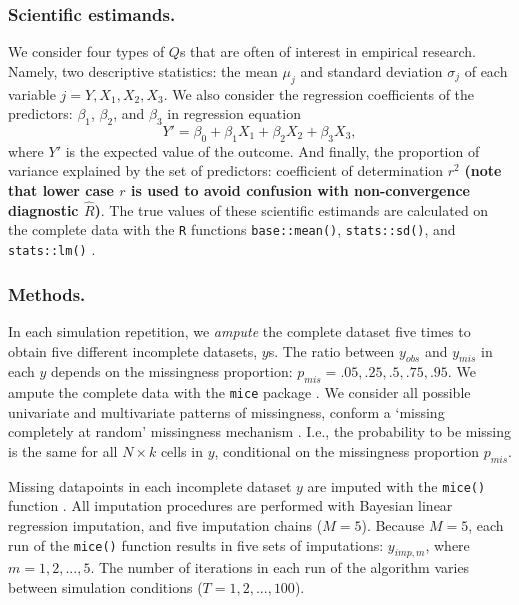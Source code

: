 \documentclass[Royal,times,sageh]{sagej}
\begin{document}
\hypertarget{scientific-estimands.}{%
\subsubsection{Scientific estimands.}\label{scientific-estimands.}}

We consider four types of \(Q\)s that are often of interest in empirical research. Namely, two descriptive statistics: the mean \(\mu_j\) and standard deviation \(\sigma_j\) of each variable \(j = Y, X_1, X_2, X_3\). We also consider the regression coefficients of the predictors: \(\beta_1\), \(\beta_2\), and \(\beta_3\) in regression equation
\[Y' = \beta_0 + \beta_1 X_1 + \beta_2 X_2 + \beta_3 X_3,\]
where \(Y'\) is the expected value of the outcome. And finally, the proportion of variance explained by the set of predictors: coefficient of determination \(r^2\) \textbf{(note that lower case \(r\) is used to avoid confusion with non-convergence diagnostic \(\widehat{R}\))}. The true values of these scientific estimands are calculated on the complete data with the \texttt{R} functions \texttt{base::mean()}, \texttt{stats::sd()}, and \texttt{stats::lm()} \citep{R}.

\hypertarget{methods.}{%
\subsubsection{Methods.}\label{methods.}}

In each simulation repetition, we \emph{ampute} the complete dataset five times to obtain five different incomplete datasets, \(y\)s. The ratio between \(y_{obs}\) and \(y_{mis}\) in each \(y\) depends on the missingness proportion: \(p_{mis} =.05,.25,.5,.75,.95\). We ampute the complete data with the \texttt{mice} package \citep[function \texttt{mice::ampute()};][]{mice}. We consider all possible univariate and multivariate patterns of missingness, conform a `missing completely at random' missingness mechanism \citep{rubin87}. I.e., the probability to be missing is the same for all \(N \times k\) cells in \(y\), conditional on the missingness proportion \(p_{mis}\).

Missing datapoints in each incomplete dataset \(y\) are imputed with the \texttt{mice()} function \citep{mice}. All imputation procedures are performed with Bayesian linear regression imputation, and five imputation chains (\(M=5\)). Because \(M=5\), each run of the \texttt{mice()} function results in five sets of imputations: \(y_{imp,m}\), where \(m = 1, 2, ..., 5\). The number of iterations in each run of the algorithm varies between simulation conditions (\(T=1,2,...,100\)).
\end{document}
